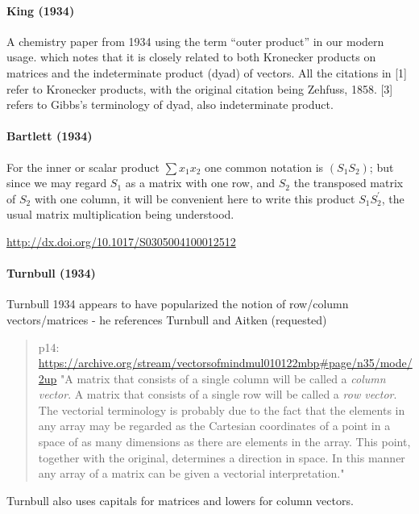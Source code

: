 \paragraph{King (1934)}

A chemistry paper from 1934 using the term ``outer product'' in
our modern usage. which notes that it is closely related to both Kronecker products on
matrices and the indeterminate product (dyad) of vectors. All the
citations in [1] refer to Kronecker products, with the original
citation being Zehfuss, 1858. [3] refers to Gibbs's terminology of
dyad, also indeterminate product.



\paragraph{Bartlett (1934)}

For the
inner or scalar product $\sum x_1 x_2 $
 one common notation is $(S_1 S_2)$; but
since we may regard $S_1$ as a matrix with one row, and $S_2$ the
transposed matrix of $S_2$ with one column, it will be convenient here
to write this product $S_1 S_2^\prime$, the usual matrix multiplication being
understood.

\url{http://dx.doi.org/10.1017/S0305004100012512}



\paragraph{Turnbull (1934)}

Turnbull 1934 appears to have popularized the notion of row/column vectors/matrices - he references Turnbull and Aitken (requested)

\begin{quote}
p14: \url{https://archive.org/stream/vectorsofmindmul010122mbp#page/n35/mode/2up}
"A matrix that consists of a single column will be called a \textit{column vector}. A
matrix that consists of a single row will be called a \textit{row vector}. The
vectorial terminology is probably due to the fact that the elements in any
array may be regarded as the Cartesian coordinates of a point in a space of as
many dimensions as there are elements in the array. This point, together with
the original, determines a direction in space. In this manner any array of a
matrix can be given a vectorial interpretation."
\end{quote}

Turnbull also uses capitals for matrices and lowers for column vectors.

